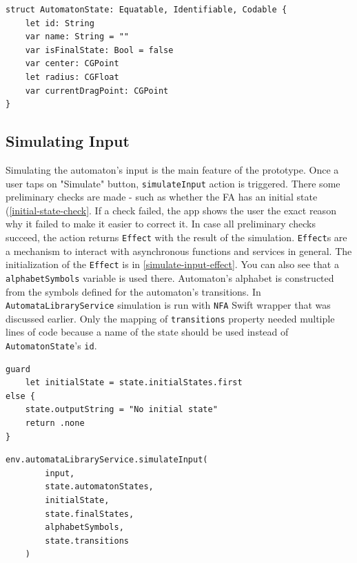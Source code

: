 \begin{lstlisting}[caption={State model}, label=state-model]
struct AutomatonState: Equatable, Identifiable, Codable {
    let id: String
    var name: String = ""
    var isFinalState: Bool = false
    var center: CGPoint
    let radius: CGFloat
    var currentDragPoint: CGPoint
}
\end{lstlisting}

\subsection{Simulating Input}

Simulating the automaton's input is the main feature of the prototype. Once a user taps on "Simulate" button, \lstinline{simulateInput} action is triggered. There some preliminary checks are made - such as whether the FA has an initial state (\ref{initial-state-check}. If a check failed, the app shows the user the exact reason why it failed to make it easier to correct it. In case all preliminary checks succeed, the action returns \lstinline{Effect} with the result of the simulation. \lstinline{Effect}s are a mechanism to interact with asynchronous functions and services in general. The initialization of the \lstinline{Effect} is in \ref{simulate-input-effect}. You can also see that a \lstinline{alphabetSymbols} variable is used there. Automaton's alphabet is constructed from the symbols defined for the automaton's transitions. In \lstinline{AutomataLibraryService} simulation is run with \lstinline{NFA} Swift wrapper that was discussed earlier. Only the mapping of \lstinline{transitions} property needed multiple lines of code because a name of the state should be used instead of \lstinline{AutomatonState}'s \lstinline{id}.

\begin{lstlisting}[caption={Check for initiail state}, label=initial-state-check]
guard
    let initialState = state.initialStates.first
else {
    state.outputString = "No initial state"
    return .none
}
\end{lstlisting}   

\begin{lstlisting}[caption={Effect for simulating input}, label=simulate-input-effect]
env.automataLibraryService.simulateInput(
        input,
        state.automatonStates,
        initialState,
        state.finalStates,
        alphabetSymbols,
        state.transitions
    )
\end{lstlisting}

